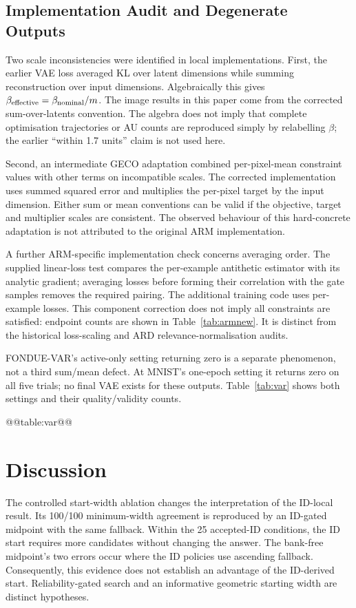 \subsection{Implementation Audit and Degenerate Outputs}
Two scale inconsistencies were identified in local implementations.
First, the earlier VAE loss averaged KL over latent dimensions while
summing reconstruction over input dimensions. Algebraically this gives
$\beta_{\rm effective}=\beta_{\rm nominal}/m$. The image results in
this paper come from the corrected sum-over-latents convention. The
algebra does not imply that complete optimisation trajectories or AU
counts are reproduced simply by relabelling $\beta$; the earlier
``within 1.7 units'' claim is not used here.

Second, an intermediate GECO adaptation combined per-pixel-mean
constraint values with other terms on incompatible scales. The corrected
implementation uses summed squared error and multiplies the per-pixel
target by the input dimension. Either sum or mean conventions can be
valid if the objective, target and multiplier scales are consistent.
The observed behaviour of this hard-concrete adaptation is not attributed
to the original ARM implementation.

A further ARM-specific implementation check concerns averaging order.
The supplied linear-loss test compares the per-example antithetic
estimator with its analytic gradient; averaging losses before forming
their correlation with the gate samples removes the required pairing.
The additional training code uses per-example losses. This component
correction does not imply all constraints are satisfied: endpoint
counts are shown in Table~\ref{tab:armnew}. It is distinct from the
historical loss-scaling and ARD relevance-normalisation audits.

FONDUE-VAR's active-only setting returning zero is a separate phenomenon,
not a third sum/mean defect. At MNIST's one-epoch setting it returns zero
on all five trials; no final VAE exists for these outputs.
Table~\ref{tab:var} shows both settings and their quality/validity counts.

@@table:var@@

\section{Discussion}\label{sec:discussion}
The controlled start-width ablation changes the interpretation of the
ID-local result. Its 100/100 minimum-width agreement is reproduced by
an ID-gated midpoint with the same fallback. Within the 25 accepted-ID
conditions, the ID start requires more candidates without changing the
answer. The bank-free midpoint's two errors occur where the ID policies
use ascending fallback. Consequently, this evidence does not establish
an advantage of the ID-derived start. Reliability-gated search and an
informative geometric starting width are distinct hypotheses.

